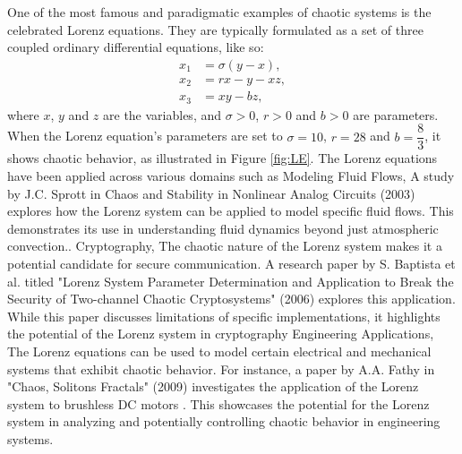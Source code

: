 \documentclass[11pt]{article}
\begin{document}
One of the most famous and paradigmatic examples of chaotic systems is the celebrated Lorenz equations. They are typically formulated as a set of three coupled ordinary differential equations, like so:
\begin{align*}
{x_1} &= \sigma(y - x), \\
{x_2} &= rx - y - xz, \\
{x_3} &= xy - bz,
\end{align*}
where $x$, $y$ and $z$ are the variables, and $\sigma > 0$, $r > 0$ and $b > 0$ are parameters. \\
When the Lorenz equation's parameters are set to $\sigma = 10$, $r = 28$ and $b = \dfrac{8}{3}$, it shows chaotic behavior, as illustrated in Figure \ref{fig:LE}. The Lorenz equations \cite{noauthor_lorenz_nodate} have been applied across various domains such as Modeling Fluid Flows,  A study by J.C. Sprott in Chaos and Stability in Nonlinear Analog Circuits (2003) \cite{bond_compact_2010} explores how the Lorenz system can be applied to model specific fluid flows. This demonstrates its use in understanding fluid dynamics beyond just atmospheric convection.\cite{elhadj_models_2011}.
Cryptography, The chaotic nature of the Lorenz system makes it a potential candidate for secure communication. A research paper by S. Baptista et al. titled "Lorenz System Parameter Determination and Application to Break the Security of Two-channel Chaotic Cryptosystems" (2006) explores this application. While this paper discusses limitations of specific implementations, it highlights the potential of the Lorenz system in cryptography \cite{orue_lorenz_2006}
Engineering Applications, The Lorenz equations can be used to model certain electrical and mechanical systems that exhibit chaotic behavior. For instance, a paper by A.A. Fathy in "Chaos, Solitons  Fractals" (2009) investigates the application of the Lorenz system to brushless DC motors \cite{qi_energy_2017}. This showcases the potential for the Lorenz system in analyzing and potentially controlling chaotic behavior in engineering systems.

\printbibliography
\end{document}
